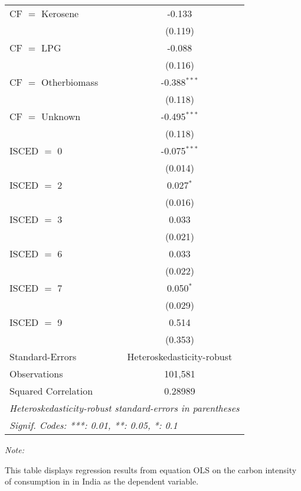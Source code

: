 \begin{table}[htbp!]
\begin{adjustbox}{width = 1\textwidth, max height = 0.95\textheight, center}
\begin{threeparttable}[b]
\begin{tabular}{lc}
            CF $=$ Kerosene     & -0.133\\   
                                & (0.119)\\   
            CF $=$ LPG          & -0.088\\   
                                & (0.116)\\   
            CF $=$ Otherbiomass & -0.388$^{***}$\\   
                                & (0.118)\\   
            CF $=$ Unknown      & -0.495$^{***}$\\   
                                & (0.118)\\   
            ISCED $=$ 0         & -0.075$^{***}$\\   
                                & (0.014)\\   
            ISCED $=$ 2         & 0.027$^{*}$\\   
                                & (0.016)\\   
            ISCED $=$ 3         & 0.033\\   
                                & (0.021)\\   
            ISCED $=$ 6         & 0.033\\   
                                & (0.022)\\   
            ISCED $=$ 7         & 0.050$^{*}$\\   
                                & (0.029)\\   
            ISCED $=$ 9         & 0.514\\   
                                & (0.353)\\   
            \midrule 
            Standard-Errors     & Heteroskedasticity-robust \\   
            Observations        & 101,581\\  
            Squared Correlation & 0.28989\\  
            \midrule \midrule
            \multicolumn{2}{l}{\emph{Heteroskedasticity-robust standard-errors in parentheses}}\\
            \multicolumn{2}{l}{\emph{Signif. Codes: ***: 0.01, **: 0.05, *: 0.1}}\\
         \end{tabular}
         
         \begin{tablenotes}\item \medskip \textit{Note:}
            \item This table displays regression results from equation OLS on the carbon intensity of consumption in  in India as the dependent variable. 
         \end{tablenotes}
      \end{threeparttable}
   \end{adjustbox}
\end{table}


